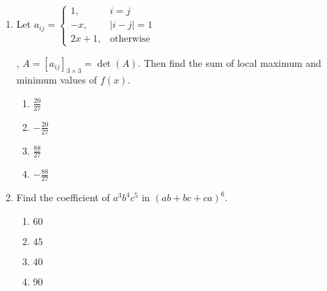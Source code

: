 \documentclass[journal]{IEEEtran}
\newcommand{\brak}[1]{\left( #1 \right)}
\newcommand{\sbrak}[1]{\left[ #1 \right]}
\newcommand{\abs}[1]{\left| #1 \right|}
\newcommand{\gt}{>}
\begin{document}
\begin{enumerate}
        $\mathbf{r_1} = \alpha \hat{i} + 2 \hat{j} + 2 \hat{k} + \lambda \brak{\hat{i} - 2 \hat{j} + 2 \hat{k}}$
        
        , $\lambda \in \mathbb{R}$, $\alpha \gt 0$ and
        
        $\mathbf{r_2} = -4 \hat{i} - \hat{k} + \mu \brak{3 \hat{i} - 2 \hat{j} - 2 \hat{k}}$
        
        , $\mu \in \mathbb{R}$ is 9, then the value of $\alpha$ is:
        
        \begin{multicols}{4}
        \begin{enumerate}
        \item $2$
        \item $4$
        \item $6$
        \item $\sqrt{6}$
        \end{enumerate}
        \end{multicols}
        
        
    \item Let $a_{ij} = \begin{cases}
        1, & i = j \\
        -x, & \abs{i - j} = 1 \\
        2x + 1, & \text{otherwise}
        \end{cases}$
        
        , $A = \sbrak{a_{ij}}_{3 \times 3} = \det\brak{A}$. Then find the sum of local maximum and minimum values of $f\brak{x}$.
        
        \begin{multicols}{4}
        \begin{enumerate}
        \item $\frac{20}{27}$
        \item $-\frac{20}{27}$
        \item $\frac{88}{27}$
        \item $-\frac{88}{27}$
        \end{enumerate}
        \end{multicols}

    \item Find the coefficient of $a^3b^4c^5$ in $\brak{ab + bc + ca}^6$.
        
        \begin{multicols}{4}
        \begin{enumerate}
        \item $60$
        \item $45$
        \item $40$
        \item $90$
        \end{enumerate}
        \end{multicols}
        

\end{enumerate}
\end{document}

